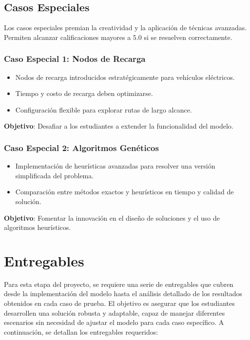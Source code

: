\documentclass[12pt]{article}
\begin{document}
\subsection{Casos Especiales}
Los casos especiales premian la creatividad y la aplicación de técnicas avanzadas. Permiten alcanzar calificaciones mayores a 5.0 si se resuelven correctamente.

\subsubsection{Caso Especial 1: Nodos de Recarga}
\begin{itemize}
    \item Nodos de recarga introducidos estratégicamente para vehículos eléctricos.
    \item Tiempo y costo de recarga deben optimizarse.
    \item Configuración flexible para explorar rutas de largo alcance.
\end{itemize}
\textbf{Objetivo}: Desafiar a los estudiantes a extender la funcionalidad del modelo.

\subsubsection{Caso Especial 2: Algoritmos Genéticos}
\begin{itemize}
    \item Implementación de heurísticas avanzadas para resolver una versión simplificada del problema.
    \item Comparación entre métodos exactos y heurísticos en tiempo y calidad de solución.
\end{itemize}
\textbf{Objetivo}: Fomentar la innovación en el diseño de soluciones y el uso de algoritmos heurísticos.

\section{Entregables}

Para esta etapa del proyecto, se requiere una serie de entregables que cubren desde la implementación del modelo hasta el análisis detallado de los resultados obtenidos en cada caso de prueba. El objetivo es asegurar que los estudiantes desarrollen una solución robusta y adaptable, capaz de manejar diferentes escenarios sin necesidad de ajustar el modelo para cada caso específico. A continuación, se detallan los entregables requeridos:
\end{document}
